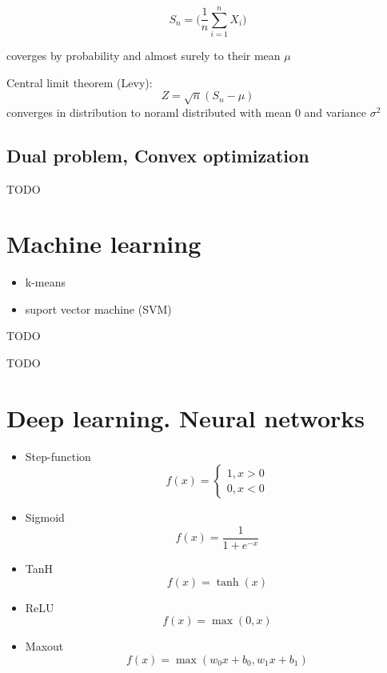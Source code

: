 \documentclass{article}
\begin{document}
\[ S_n=\big({\frac{1}{n}}\sum_{i=1}^{n}X_{i}\big) \] 

coverges by probability and almost surely to their mean $\mu$ 

Central limit theorem (Levy): \\
\[ Z = \sqrt{n} (S_n-\mu) \] converges in distribution to noraml distributed with mean $0$ and variance $\sigma^2$

\subsection{Dual problem, Convex optimization}
TODO
\section{Machine learning}


\begin{itemize}
\item k-means
\item suport vector machine (SVM)
\end{itemize}

TODO

TODO

\section{Deep learning. Neural networks}


\begin{itemize}
    \item Step-function $$f(x)=\begin{cases} 1, x>0 \\ 0,  x<0 \end{cases}$$
    \item Sigmoid $$f(x)=\frac{1}{1+e^{-x}}$$
    \item TanH $$ f(x)=\tanh(x)$$
    \item ReLU $$f(x)=\max(0,x)$$
    \item Maxout $$f(x) = \max(w_0x + b_0, w_1x + b_1)$$
\end{itemize}
\end{document}
